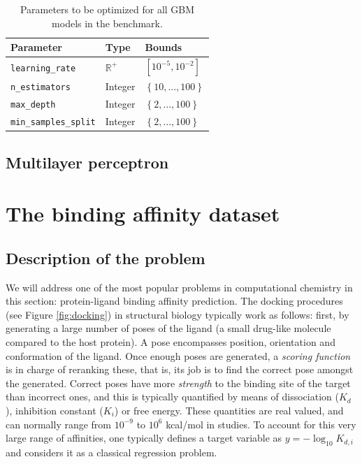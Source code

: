 \documentclass[10pt,a4paper,twoside]{book}
\begin{document}
\begin{table}[]
\centering
\caption{Parameters to be optimized for all GBM models in the benchmark.}
\label{gbmparam}
\begin{tabular}{@{}lll@{}}
\toprule
\textbf{Parameter}             & \textbf{Type}  & \textbf{Bounds}                          \\ \midrule
\texttt{learning\_rate}      & $\mathbb{R}^+$ & $\left[10^{-5}, 10^{-2}\right]$                         \\
\texttt{n\_estimators}       & Integer        & $\left\lbrace 10,\dots, 100 \right\rbrace$ \\
\texttt{max\_depth}          & Integer        & $\left\lbrace 2, \dots, 100 \right\rbrace$ \\
\texttt{min\_samples\_split}  & Integer        & $\left\lbrace 2, \dots, 100 \right\rbrace$
\end{tabular}
\end{table}

\subsection{Multilayer perceptron}

\section{The binding affinity dataset}

\subsection{Description of the problem}

We will address one of the most popular problems in computational chemistry in this section: protein-ligand binding affinity prediction. The docking procedures (see Figure \ref{fig:docking}) in structural biology typically work as follows: first, by generating a large number of poses of the ligand (a small drug-like molecule compared to the host protein). A pose encompasses position, orientation and conformation of the ligand. Once enough poses are generated, a \textit{scoring function} is in charge of reranking these, that is, its job is to find the correct pose amongst the generated. Correct poses have more \textit{strength} to the binding site of the target than incorrect ones, and this is typically quantified by means of dissociation ($K_d$), inhibition constant ($K_i$) or free energy. These quantities are real valued, and can normally range from $10^{-9}$ to $10^6$ kcal/mol in studies. To account for this very large range of affinities, one typically defines a target variable as $y=-\log_{10}K_{d,i}$ and considers it as a classical regression problem.\\
\end{document}
